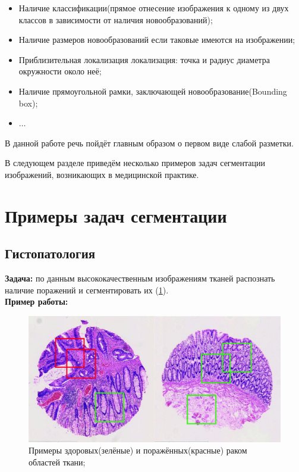 \begin{itemize}
    \item Наличие классификации(прямое отнесение изображения к одному из двух классов в зависимости от наличия новообразований);
    \item Наличие размеров новообразований если таковые имеются на изображении;
    \item Приблизительная локализация локализация: точка и радиус диаметра окружности около неё;
    \item Наличие прямоугольной рамки, заключающей новообразование(Bounding box);
    \item $\dots$
\end{itemize}

В данной работе речь пойдёт главным образом о первом виде слабой разметки.

В следующем разделе приведём несколько примеров задач сегментации изображений, возникающих в медицинской практике.

\section{Примеры задач сегментации}

\subsection{Гистопатология}

{\bf Задача:} по данным высококачественным изображениям тканей распознать наличие поражений и сегментировать их (\ref{fig:histo}).
\\
{\bf Пример работы:} \cite{xu_weakly_2014}


\begin{figure}[ht] 
  \center
  \includegraphics [scale=0.27] {images/histo_1.png}
  \caption{Примеры здоровых(зелёные) и поражённых(красные) раком областей ткани; \cite{xu_weakly_2014}} 
  \label{fig:histo}  
\end{figure}



